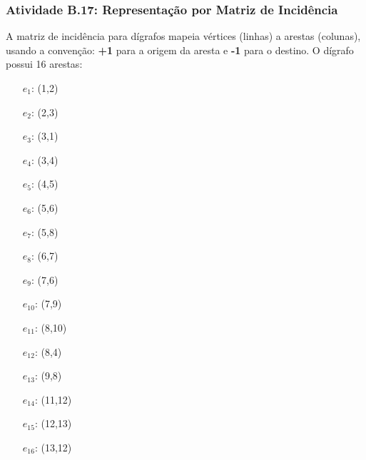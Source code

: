 \documentclass[a4paper,12pt]{article}
\begin{document}
\subsubsection*{Atividade B.17: Representação por Matriz de Incidência}
A matriz de incidência para dígrafos mapeia vértices (linhas) a arestas (colunas), usando a convenção: \textbf{+1} para a origem da aresta e \textbf{-1} para o destino. O dígrafo possui 16 arestas:
\begin{multicols}{3}
\begin{itemize}[nosep, leftmargin=*]
    \item[$e_1$:] (1,2) \item[$e_2$:] (2,3) \item[$e_3$:] (3,1) \item[$e_4$:] (3,4) \item[$e_5$:] (4,5) \item[$e_6$:] (5,6)
    \item[$e_7$:] (5,8) \item[$e_8$:] (6,7) \item[$e_9$:] (7,6) \item[$e_{10}$:] (7,9) \item[$e_{11}$:] (8,10) \item[$e_{12}$:] (8,4)
    \item[$e_{13}$:] (9,8) \item[$e_{14}$:] (11,12) \item[$e_{15}$:] (12,13) \item[$e_{16}$:] (13,12)
\end{itemize}
\end{multicols}
\end{document}
